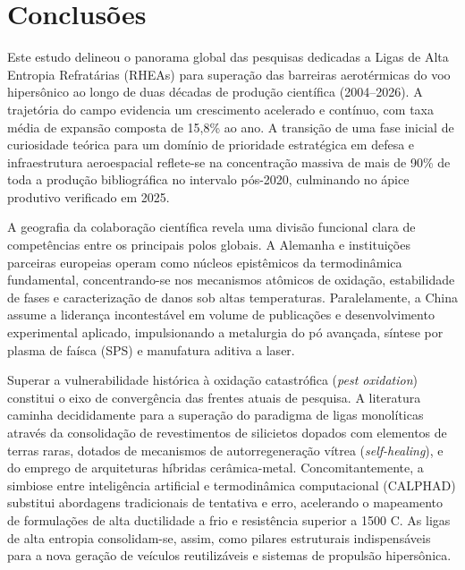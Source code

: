 \section{Conclusões}\label{sec:conclusoes}

Este estudo delineou o panorama global das pesquisas dedicadas a Ligas de Alta Entropia Refratárias (RHEAs) para superação das barreiras aerotérmicas do voo hipersônico ao longo de duas décadas de produção científica (2004--2026). A trajetória do campo evidencia um crescimento acelerado e contínuo, com taxa média de expansão composta de 15,8\% ao ano. A transição de uma fase inicial de curiosidade teórica para um domínio de prioridade estratégica em defesa e infraestrutura aeroespacial reflete-se na concentração massiva de mais de 90\% de toda a produção bibliográfica no intervalo pós-2020, culminando no ápice produtivo verificado em 2025.

A geografia da colaboração científica revela uma divisão funcional clara de competências entre os principais polos globais. A Alemanha e instituições parceiras europeias operam como núcleos epistêmicos da termodinâmica fundamental, concentrando-se nos mecanismos atômicos de oxidação, estabilidade de fases e caracterização de danos sob altas temperaturas. Paralelamente, a China assume a liderança incontestável em volume de publicações e desenvolvimento experimental aplicado, impulsionando a metalurgia do pó avançada, síntese por plasma de faísca (SPS) e manufatura aditiva a laser.

Superar a vulnerabilidade histórica à oxidação catastrófica (\emph{pest oxidation}) constitui o eixo de convergência das frentes atuais de pesquisa. A literatura caminha decididamente para a superação do paradigma de ligas monolíticas através da consolidação de revestimentos de silicietos dopados com elementos de terras raras, dotados de mecanismos de autorregeneração vítrea (\emph{self-healing}), e do emprego de arquiteturas híbridas cerâmica-metal. Concomitantemente, a simbiose entre inteligência artificial e termodinâmica computacional (CALPHAD) substitui abordagens tradicionais de tentativa e erro, acelerando o mapeamento de formulações de alta ductilidade a frio e resistência superior a 1500 \textdegree{}C. As ligas de alta entropia consolidam-se, assim, como pilares estruturais indispensáveis para a nova geração de veículos reutilizáveis e sistemas de propulsão hipersônica.
